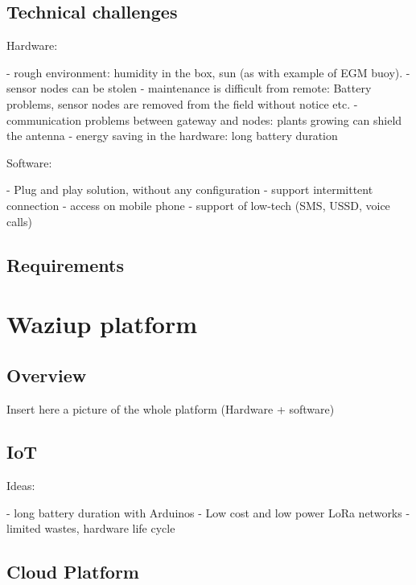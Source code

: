 \documentclass[10pt, conference, compsocconf]{IEEEtran}
\newcommand {\0} {\mathbf 0}
\newcommand {\1} {\mathbf 1}
\begin{document}
\subsection{Technical challenges}

\begin{markdown}
Hardware:

- rough environment: humidity in the box, sun (as with example of EGM buoy).
- sensor nodes can be stolen
- maintenance is difficult from remote: Battery problems, sensor nodes are removed from the field without notice etc.
- communication problems between gateway and nodes: plants growing can shield the antenna
- energy saving in the hardware: long battery duration

Software:

- Plug and play solution, without any configuration
- support intermittent connection
- access on mobile phone
- support of low-tech (SMS, USSD, voice calls)

\end{markdown}


\subsection{Requirements}

\section{Waziup platform}
\label{iot}

\subsection{Overview}

Insert here a picture of the whole platform (Hardware + software)

\subsection{IoT}

\begin{markdown}
Ideas:

- long battery duration with Arduinos
- Low cost and low power LoRa networks
- limited wastes, hardware life cycle
\end{markdown}
\subsection{Cloud Platform}
\end{document}
